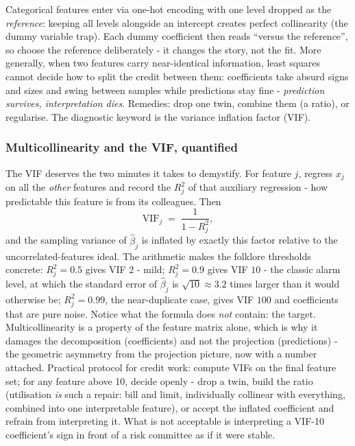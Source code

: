 \documentclass[11pt,a4paper]{article}
\begin{document}
Categorical features enter via one-hot encoding with one level dropped as
the \emph{reference}: keeping all levels alongside an intercept creates
perfect collinearity (the dummy variable trap). Each dummy coefficient then
reads ``versus the reference'', so choose the reference deliberately -
it changes the story, not the fit. More generally, when two features carry
near-identical information, least squares cannot decide how to split the
credit between them: coefficients take absurd signs and sizes and swing
between samples while predictions stay fine - \emph{prediction survives,
interpretation dies}. Remedies: drop one twin, combine them (a ratio), or
regularise. The diagnostic keyword is the variance inflation factor (VIF).

\subsubsection{Multicollinearity and the VIF, quantified}
The VIF deserves the two minutes it takes to demystify. For feature
$j$, regress $x_j$ on all the \emph{other} features and record the
$R_j^2$ of that auxiliary regression - how predictable this feature is
from its colleagues. Then
\[
  \mathrm{VIF}_j \;=\; \frac{1}{1 - R_j^2},
\]
and the sampling variance of $\hat\beta_j$ is inflated by exactly this
factor relative to the uncorrelated-features ideal. The arithmetic makes
the folklore thresholds concrete: $R_j^2 = 0.5$ gives VIF $2$ - mild;
$R_j^2 = 0.9$ gives VIF $10$ - the classic alarm level, at which the
standard error of $\hat\beta_j$ is $\sqrt{10} \approx 3.2$ times larger
than it would otherwise be; $R_j^2 = 0.99$, the near-duplicate case,
gives VIF $100$ and coefficients that are pure noise. Notice what the
formula does \emph{not} contain: the target. Multicollinearity is a
property of the feature matrix alone, which is why it damages the
decomposition (coefficients) and not the projection (predictions) - the
geometric asymmetry from the projection picture, now with a number
attached. Practical protocol for credit work: compute VIFs on the final
feature set; for any feature above 10, decide openly - drop a twin,
build the ratio (utilisation \emph{is} such a repair: bill and limit,
individually collinear with everything, combined into one interpretable
feature), or accept the inflated coefficient and refrain from
interpreting it. What is not acceptable is interpreting a VIF-10
coefficient's sign in front of a risk committee as if it were stable.
\end{document}
